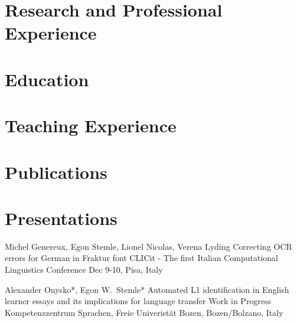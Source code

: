 \documentclass[10pt,a4paper,sans]{moderncv}
\begin{document}
\makecvtitle

\section*{}


\section{Research and Professional Experience}


\section{Education}


\section{Teaching Experience}


\section{Publications}


\section{Presentations}
        {Michel Genereux, Egon Stemle, Lionel Nicolas, Verena Lyding}
        {Correcting OCR errors for German in Fraktur font}
        {CLICit - The first Italian Computational Linguistics Conference}
        {Dec 9-10, Pisa, Italy}
        {}

    
        {Alexander Onysko*, Egon W.~Stemle*}
        {Automated L1 identification in English learner essays and its
        implications for language transfer}
        {Work in Progress}
        {Kompetenzzentrum Sprachen, Freie Univeristät Bozen, Bozen/Bolzano, Italy}
        {}
\end{document}
